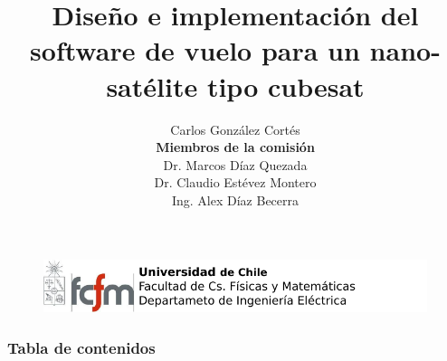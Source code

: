 \documentclass[xcolor=dvipsnames]{beamer}
\title[Trabajo de título]{Diseño e implementación del software de vuelo para un nano-satélite tipo cubesat}
\author[Carlos González Cortés]{
\footnotesize
Carlos González Cortés\\
\vspace*{1cm}
\textbf{Miembros de la comisión}\\
Dr. Marcos Díaz Quezada\\
Dr. Claudio Estévez Montero\\
Ing. Alex Díaz Becerra}
\date{}
\institute[]{Universidad de Chile}
\begin{document}
	\begin{frame}[plain]
        \begin{figure}[t]
            \begin{flushleft}
				\includegraphics[scale=0.5]{img/logo.pdf}
            \end{flushleft}
        \end{figure}
        
		\titlepage
	\end{frame}

	\begin{frame}
		\transdissolve
		\frametitle{Tabla de contenidos}
		\tableofcontents[pausesections]
	\end{frame}

\end{document}

